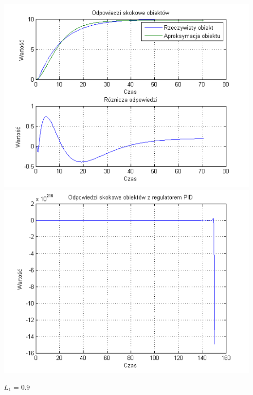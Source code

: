 \documentclass[10pt,a4paper]{article}
\begin{document}
\begin{center}
\includegraphics[scale=1]{images/dwa/skrypt_221.png}\\
\includegraphics[scale=1]{images/dwa/skrypt_222.png}\\
\end{center}
\newpage
$L_1$ = 0.9
\end{document}
